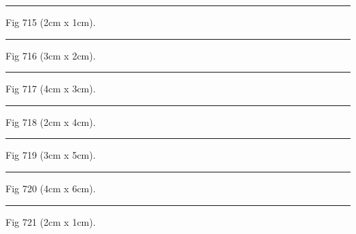 \documentclass[a4paper,11pt]{article}
\begin{document}
\begin{swarmwrap}%
  \begin{minipage}[t]{2cm}
    \centering
    \rule{\linewidth}{1cm}
    {\footnotesize Fig 715 (2cm x 1cm).}
  \end{minipage}%
\end{swarmwrap}%
\swarmwrapnext
\lipsum[115]%

\begin{swarmwrap}%
  \begin{minipage}[t]{3cm}
    \centering
    \rule{\linewidth}{2cm}
    {\footnotesize Fig 716 (3cm x 2cm).}
  \end{minipage}%
\end{swarmwrap}%
\swarmwrapnext
\lipsum[116]%

\begin{swarmwrap}%
  \begin{minipage}[t]{4cm}
    \centering
    \rule{\linewidth}{3cm}
    {\footnotesize Fig 717 (4cm x 3cm).}
  \end{minipage}%
\end{swarmwrap}%
\swarmwrapnext
\lipsum[117]%

\begin{swarmwrap}%
  \begin{minipage}[t]{2cm}
    \centering
    \rule{\linewidth}{4cm}
    {\footnotesize Fig 718 (2cm x 4cm).}
  \end{minipage}%
\end{swarmwrap}%
\swarmwrapnext
\lipsum[118]%

\begin{swarmwrap}%
  \begin{minipage}[t]{3cm}
    \centering
    \rule{\linewidth}{5cm}
    {\footnotesize Fig 719 (3cm x 5cm).}
  \end{minipage}%
\end{swarmwrap}%
\swarmwrapnext
\lipsum[119]%

\begin{swarmwrap}%
  \begin{minipage}[t]{4cm}
    \centering
    \rule{\linewidth}{6cm}
    {\footnotesize Fig 720 (4cm x 6cm).}
  \end{minipage}%
\end{swarmwrap}%
\swarmwrapnext
\lipsum[120]%

\begin{swarmwrap}%
  \begin{minipage}[t]{2cm}
    \centering
    \rule{\linewidth}{1cm}
    {\footnotesize Fig 721 (2cm x 1cm).}
  \end{minipage}%
\end{swarmwrap}%
\swarmwrapnext
\lipsum[121]%
\end{document}
